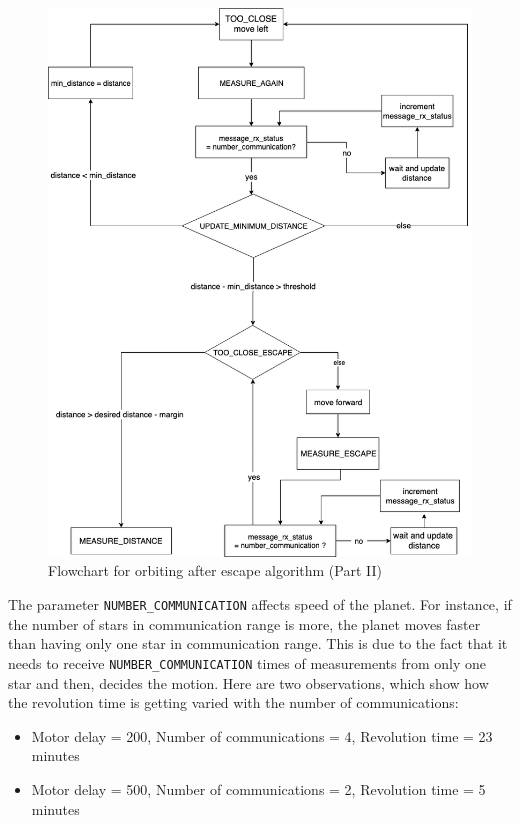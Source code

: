 \documentclass{report}[12pt]
\begin{document}
\begin{figure}[H]
	\centering
	\includegraphics[scale=0.55]{star_planet_escape2}
	\caption{Flowchart for orbiting after escape algorithm (Part II)}
	\label{fig:orbit_after_escape2}
\end{figure}

The parameter \texttt{NUMBER\_COMMUNICATION} affects speed of the planet. For instance, if the number of stars in communication range is more, the planet moves faster than having only one star in communication range. This is due to the fact that it needs to receive \texttt{NUMBER\_COMMUNICATION} times of measurements  from only one star and then, decides the motion. Here are two observations, which show how the revolution time is getting varied with the number of  communications:
\begin{itemize}
	\item Motor delay = 200, Number of communications = 4, Revolution time
	      = 23 minutes
	\item Motor delay = 500, Number of communications = 2, Revolution time = 5 minutes
\end{itemize}
\end{document}
